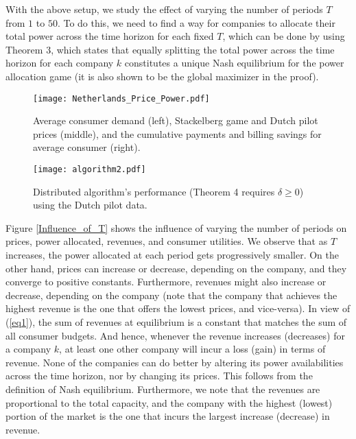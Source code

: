 With the above setup, we study the effect of varying the number of periods $T$ from $1$ to $50$. To do this, we need to find a way for companies to allocate their total power across the time horizon for each fixed $T$, which can be done by using Theorem 3, which states that equally splitting the total power across the time horizon for each company $k$ constitutes a unique Nash equilibrium for the power allocation game (it is also shown to be the global maximizer in the proof). 
 \begin{figure*}
\centering
\texttt{[image: Netherlands\_Price\_Power.pdf]}
\caption{Average consumer demand (left), Stackelberg game and Dutch pilot prices (middle), and the cumulative payments and billing savings for average consumer (right).}
\label{Netherlands_Price_Power}
\end{figure*}
\begin{figure*}
\centering
\texttt{[image: algorithm2.pdf]}
\caption{Distributed algorithm's performance (Theorem 4 requires $\delta\geq0$) using the Dutch pilot data.}
\label{algorithm2}
\end{figure*}
Figure \ref{Influence_of_T} shows the influence of varying the number of periods on prices, power allocated, revenues, and consumer utilities. We observe that as $T$ increases, the power allocated at each period gets progressively smaller. On the other hand, prices can increase or decrease, depending on the company, and they converge to positive constants. Furthermore, revenues might also increase or decrease, depending on the company (note that the company that achieves the highest revenue is the one that offers the lowest prices, and vice-versa). In view of (\ref{eq1}), the sum of revenues at equilibrium is a constant that matches the sum of all consumer budgets. And hence, whenever the revenue increases (decreases) for a company $k$, at least one other company will incur a loss (gain) in terms of revenue. None of the companies can do better by altering its power availabilities across the time horizon, nor by changing its prices. This follows from the definition of Nash equilibrium. Furthermore, we note that the revenues are proportional to the total capacity, and the company with the highest (lowest) portion of the market is the one that incurs the largest increase (decrease) in revenue. 

